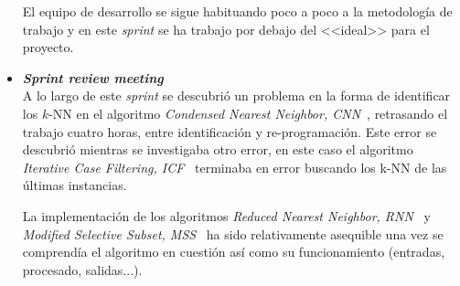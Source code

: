\begin{itemize}
El equipo de desarrollo se sigue habituando poco a poco a la metodología de trabajo y en este \textit{sprint} se ha trabajo por debajo del <<ideal>> para el proyecto. 

\item \textbf{\textit{Sprint review meeting}}\\
A lo largo de este \textit{sprint} se descubrió un problema en la forma de identificar los $k$-NN en el algoritmo \textit{Condensed Nearest Neighbor, CNN}~\cite{hart1968condensed}, retrasando el trabajo cuatro horas, entre identificación y re-programación. Este error se descubrió mientras se investigaba otro error, en este caso el algoritmo \textit{Iterative Case Filtering, ICF}~\cite{brighton2002advances} terminaba en error buscando los k-NN de las últimas instancias.

La implementación de los algoritmos \textit{Reduced Nearest Neighbor, RNN}~\cite{gates1972reduced} y \textit{Modified Selective Subset, MSS}~\cite{barandela2005decision} ha sido relativamente asequible una vez se comprendía el algoritmo en cuestión así como su funcionamiento (entradas, procesado, salidas...).
\end{itemize}

